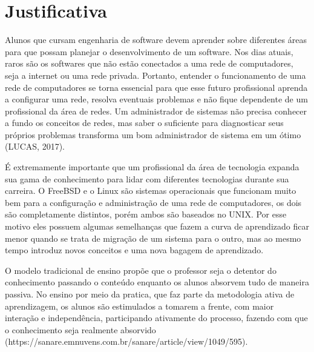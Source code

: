 %


\section{Justificativa}

Alunos que cursam engenharia de software devem aprender sobre diferentes áreas para que possam planejar o desenvolvimento de um software. Nos dias atuais, raros são os softwares que não estão conectados a uma rede de computadores, seja a internet ou uma rede privada. Portanto, entender o funcionamento de uma rede de computadores se torna essencial para que esse futuro profissional aprenda a configurar uma rede, resolva eventuais problemas e não fique dependente de um profissional da área de redes. Um administrador de sistemas não precisa conhecer a fundo os conceitos de redes, mas saber o suficiente para diagnosticar seus próprios problemas transforma um bom administrador de sistema em um ótimo (LUCAS, 2017).

É extremamente importante que um profissional da área de tecnologia expanda sua gama de conhecimento para lidar com diferentes tecnologias durante sua carreira. O FreeBSD e o Linux são sistemas operacionais que funcionam muito bem para a configuração e administração de uma rede de computadores, os dois são completamente distintos, porém ambos são baseados no UNIX. Por esse motivo eles possuem algumas semelhanças que fazem a curva de aprendizado ficar menor quando se trata de migração de um sistema para o outro, mas ao mesmo tempo introduz novos conceitos e uma nova bagagem de aprendizado.

O modelo tradicional de ensino propõe que o professor seja o detentor do conhecimento passando o conteúdo enquanto os alunos absorvem tudo de maneira passiva. No ensino por meio da pratica, que faz parte da metodologia ativa de aprendizagem, os alunos são estimulados a tomarem a frente, com maior interação e independência, participando ativamente do processo, fazendo com que o conhecimento seja realmente absorvido (https://sanare.emnuvens.com.br/sanare/article/view/1049/595). %

